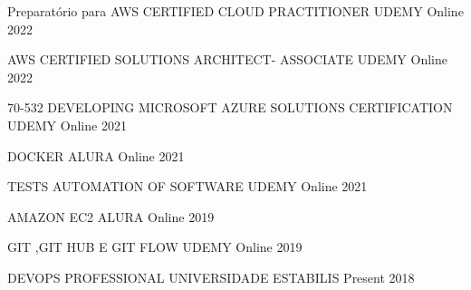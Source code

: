 

\begin{cvhonors}

  \cvhonor
    {Preparatório para AWS CERTIFIED CLOUD PRACTITIONER} %
    {UDEMY} %
    {Online} %
    {2022} %

  \cvhonor
    {AWS CERTIFIED SOLUTIONS ARCHITECT- ASSOCIATE} %
    {UDEMY} %
    {Online} %
    {2022} %

  \cvhonor
    {70-532 DEVELOPING MICROSOFT AZURE SOLUTIONS CERTIFICATION} %
    {UDEMY} %
    {Online} %
    {2021} %

  \cvhonor
    {DOCKER} %
    {ALURA} %
    {Online} %
    {2021} %

  \cvhonor
    {TESTS AUTOMATION OF SOFTWARE} %
    {UDEMY} %
    {Online} %
    {2021} %

  \cvhonor
    {AMAZON EC2} %
    {ALURA} %
    {Online} %
    {2019} %

  \cvhonor
    {GIT ,GIT HUB E GIT FLOW} %
    {UDEMY} %
    {Online} %
    {2019} %

  \cvhonor
    {DEVOPS PROFESSIONAL} %
    {UNIVERSIDADE ESTABILIS} %
    {Present} %
    {2018} %


\end{cvhonors}
